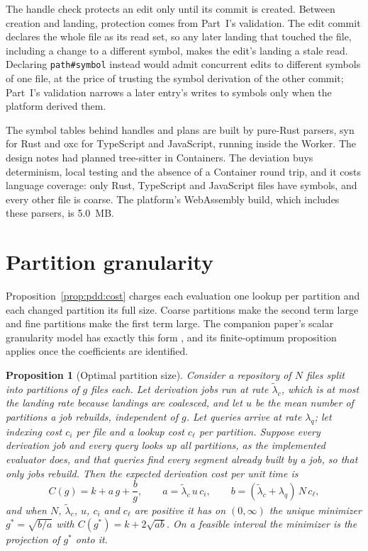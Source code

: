\documentclass[11pt,letterpaper]{article}
\newtheorem{proposition}[theorem]{Proposition}
\theoremstyle{definition}
\theoremstyle{remark}
\DeclareRobustCommand{\code}[1]{{\def\_{\textunderscore\allowbreak}\texttt{#1}}}
\begin{document}
The handle check protects an edit only until its commit is created. Between creation and landing, protection comes from Part~I's validation. The edit commit declares the whole file as its read set, so any later landing that touched the file, including a change to a different symbol, makes the edit's landing a stale read. Declaring \code{path\#symbol} instead would admit concurrent edits to different symbols of one file, at the price of trusting the symbol derivation of the other commit; Part~I's validation narrows a later entry's writes to symbols only when the platform derived them.

The symbol tables behind handles and plans are built by pure-Rust parsers, syn for Rust and oxc for TypeScript and JavaScript, running inside the Worker. The design notes had planned tree-sitter in Containers. The deviation buys determinism, local testing and the absence of a Container round trip, and it costs language coverage: only Rust, TypeScript and JavaScript files have symbols, and every other file is coarse. The platform's WebAssembly build, which includes these parsers, is 5.0~MB. %

\section{Partition granularity}
\label{sec:pdd:granularity}

Proposition~\ref{prop:pdd:cost} charges each evaluation one lookup per partition and each changed partition its full size. Coarse partitions make the second term large and fine partitions make the first term large. The companion paper's scalar granularity model has exactly this form \cite{long2026inversion}, and its finite-optimum proposition applies once the coefficients are identified.

\begin{proposition}[Optimal partition size]
\label{prop:pdd:granularity}
Consider a repository of $N$ files split into partitions of $g$ files each. Let derivation jobs run at rate $\tilde\lambda_c$, which is at most the landing rate because landings are coalesced, and let $u$ be the mean number of partitions a job rebuilds, independent of $g$. Let queries arrive at rate $\lambda_q$; let indexing cost $c_i$ per file and a lookup cost $c_\ell$ per partition. Suppose every derivation job and every query looks up all partitions, as the implemented evaluator does, and that queries find every segment already built by a job, so that only jobs rebuild. Then the expected derivation cost per unit time is
\[
C(g)=k+a\,g+\frac{b}{g},\qquad a=\tilde\lambda_c\,u\,c_i,\qquad b=(\tilde\lambda_c+\lambda_q)\,N\,c_\ell,
\]
and when $N$, $\tilde\lambda_c$, $u$, $c_i$ and $c_\ell$ are positive it has on $(0,\infty)$ the unique minimizer $g^*=\sqrt{b/a}$ with $C(g^*)=k+2\sqrt{ab}$. On a feasible interval the minimizer is the projection of $g^*$ onto it.
\end{proposition}
\end{document}
